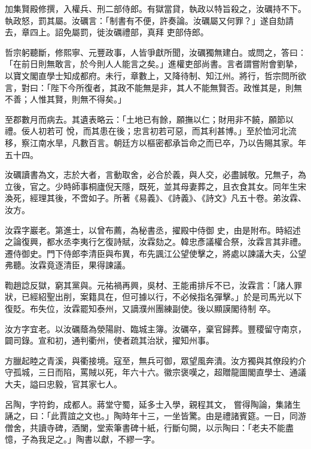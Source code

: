 \begin{pinyinscope}
 加集賢殿修撰，入權兵、刑二部侍郎。有獄當貸，執政以特旨殺之，汝礪持不下。執政怒，罰其屬。汝礪言：「制書有不便，許奏論。汝礪屬又何罪？」遂自劾請去，章四上。詔免屬罰，徙汝礪禮部，真拜
 吏部侍郎。



 哲宗躬聽斷，修熙寧、元豐政事，人皆爭獻所聞，汝礪獨無建白。或問之，答曰：「在前日則無敢言，於今則人人能言之矣。」進權吏部尚書。言者謂嘗附會劉摯，以寶文閣直學士知成都府。未行，章數上，又降待制、知江州。將行，哲宗問所欲言，對曰：「陛下今所復者，其政不能無是非，其人不能無賢否。政惟其是，則無不善；人惟其賢，則無不得矣。」



 至郡數月而病去。其遺表略云：「土地已有餘，願撫以仁；財用非不饒，願節以禮。佞人初若可
 悅，而其患在後；忠言初若可惡，而其利甚博。」至於恤河北流移，察江南水旱，凡數百言。朝廷方以樞密都承旨命之而已卒，乃以告賜其家。年五十四。



 汝礪讀書為文，志於大者，言動取舍，必合於義，與人交，必盡誠敬。兄無子，為立後，官之。少時師事桐廬倪天隱，既死，並其母妻葬之，且衣食其女。同年生宋渙死，經理其後，不啻如子。所著《易義》、《詩義》、《詩文》凡五十卷。弟汝霖、汝方。



 汝霖字巖老。第進士，以曾布薦，為秘書丞，擢殿中侍御
 史，由是附布。時紹述之論復興，都水丞李夷行乞復詩賦，汝霖劾之。韓忠彥議權合祭，汝霖言其非禮。遷侍御史。門下侍郎李清臣與布異，布先諷江公望使擊之，將處以諫議大夫，公望弗聽。汝霖竟逐清臣，果得諫議。



 鞫趙諗反獄，窮其黨與。元祐禍再興，吳材、王能甫排斥不已，汝霖言：「諸人罪狀，已經紹聖出削，案籍具在，但可據以行，不必候指名彈擊。」於是司馬光以下復貶。布失位，汝霖罷知泰州，又謫濮州團練副使。後以顯謨閣待制
 卒。



 汝方字宜老。以汝礪蔭為滎陽尉、臨城主簿。汝礪卒，棄官歸葬。豐稷留守南京，闢司錄。宣和初，通判衢州，使者疏其治狀，擢知州事。



 方臘起睦之青溪，與衢接境。寇至，無兵可御，眾望風奔潰。汝方獨與其僚段約介守孤城，三日而陷，罵賊以死，年六十六。徽宗褒嘆之，超贈龍圖閣直學士、通議大夫，謚曰忠毅，官其家七人。



 呂陶，字符鈞，成都人。蔣堂守蜀，延多士入學，親程其文，
 嘗得陶論，集諸生誦之，曰：「此賈誼之文也。」陶時年十三，一坐皆驚。由是禮諸賓筵。一日，同游僧舍，共讀寺碑，酒闌，堂索筆書碑十紙，行斷句闕，以示陶曰：「老夫不能盡憶，子為我足之。」陶書以獻，不繆一字。




\end{pinyinscope}
